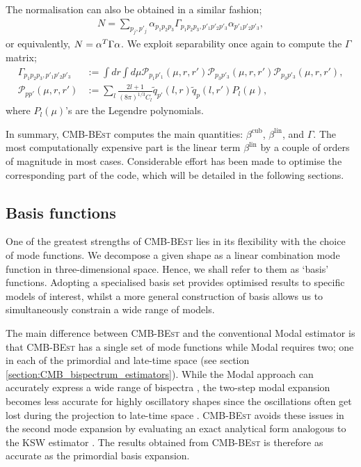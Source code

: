 The normalisation can also be obtained in a similar fashion;
\begin{align}
	N = \sum_{p_j, p'_j} \alpha_{p_1 p_2 p_3} \Gamma_{p_1 p_2 p_3, p'_1 p'_2 p'_3} \alpha_{p'_1 p'_2 p'_3}, \label{eqn:normlisation_from_gamma}
\end{align}
or equivalently, $N = \mathbf{\alpha}^T \Gamma \mathbf{\alpha}$. We exploit separability once again to compute the $\Gamma$ matrix;
\begin{align}
	\Gamma_{p_1 p_2 p_3, p'_1 p'_2 p'_3} &:= \int dr \int d\mu \mathcal{P}_{p_1 p'_1}(\mu, r, r') \mathcal{P}_{p_3 p'_3}(\mu, r, r') \mathcal{P}_{p_3 p'_3}(\mu, r, r'), 	\label{def:gamma} 	\\
	\mathcal{P}_{p p'}(\mu, r, r') &:= \sum_l \frac{2l+1}{(8\pi)^{1/3} C_l} \tilde{q}_{p'}(l,r) \tilde{q}_p(l,r') P_l(\mu),
\end{align}
where $P_l(\mu)$'s are the Legendre polynomials.

In summary, \textsc{CMB-BEst} computes the main quantities: $\beta^\text{cub}$, $\beta^\text{lin}$, and $\Gamma$. The most computationally expensive part is the linear term $\beta^\text{lin}$ by a couple of orders of magnitude in most cases. Considerable effort has been made to optimise the corresponding part of the code, which will be detailed in the following sections.

\subsection{Basis functions} \label{section:basis_functions}

One of the greatest strengths of \textsc{CMB-BEst} lies in its flexibility with the choice of mode functions. We decompose a given shape as a linear combination mode function in three-dimensional space. Hence, we shall refer to them as `basis' functions. Adopting a specialised basis set provides optimised results to specific models of interest, whilst a more general construction of basis allows us to simultaneously constrain a wide range of models.

The main difference between \textsc{CMB-BEst} and the conventional Modal estimator \cite{Fergusson2010general} is that \textsc{CMB-BEst} has a single set of mode functions while Modal requires two; one in each of the primordial and late-time space (see section \ref{section:CMB_bispectrum_estimators}). While the Modal approach can accurately express a wide range of bispectra \cite{Fergusson2012,Fergusson2014,PlanckCollaboration2013}, the two-step modal expansion becomes less accurate for highly oscillatory shapes since the oscillations often get lost during the projection to late-time space \cite{Fergusson2015a,PlanckCollaboration2018}. \textsc{CMB-BEst} avoids these issues in the second mode expansion by evaluating an exact analytical form analogous to the KSW estimator \cite{Komatsu2005}. The results obtained from \textsc{CMB-BEst} is therefore as accurate as the primordial basis expansion.

